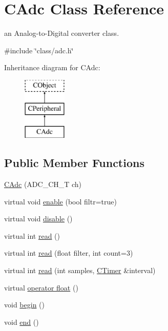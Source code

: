 \hypertarget{class_c_adc}{\section{C\-Adc Class Reference}
\label{class_c_adc}
}


an Analog-\/to-\/\-Digital converter class.  




{\ttfamily \#include \char`\"{}class/adc.\-h\char`\"{}}

Inheritance diagram for C\-Adc\-:\begin{figure}[H]
\begin{center}
\leavevmode
\includegraphics[height=3.000000cm]{d7/d0f/class_c_adc}
\end{center}
\end{figure}
\subsection*{Public Member Functions}
\begin{DoxyCompactItemize}
\item 
\hyperlink{class_c_adc_a3d122c0e7fe686958371eabc9ed0db3f}{C\-Adc} (A\-D\-C\-\_\-\-C\-H\-\_\-\-T ch)
\item 
virtual void \hyperlink{class_c_adc_a11f59e83f9a3815e7980273a0b9bdd5b}{enable} (bool filtr=true)
\item 
virtual void \hyperlink{class_c_adc_ad3fc0560a6fbbca6d1cae12b187f98b7}{disable} ()
\item 
virtual int \hyperlink{class_c_adc_aa0748ed4e15aded89101060e388af8be}{read} ()
\item 
virtual int \hyperlink{class_c_adc_a20a6e83792c914309d2b0845e798b4d7}{read} (float filter, int count=3)
\item 
virtual int \hyperlink{class_c_adc_a31643f0558a614c013d476818156a1a1}{read} (int samples, \hyperlink{class_c_timer}{C\-Timer} \&interval)
\item 
virtual \hyperlink{class_c_adc_a678a8b70b4d4a2537c99eaba562e75b8}{operator float} ()
\item 
void \hyperlink{class_c_adc_ad27b537dba363079fc68ee48050183d6}{begin} ()
\item 
void \hyperlink{class_c_adc_a83103970c96cf7f0638bc44a11fa68b6}{end} ()
\end{DoxyCompactItemize}



